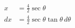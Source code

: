 \documentclass[preview]{standalone}
\begin{document}
\begin{align*}
x&=\frac{4}{2}\sec\theta \\ dx&=\frac{4}{2}\sec\theta\tan\theta \, d\theta
\end{align*}
\end{document}

